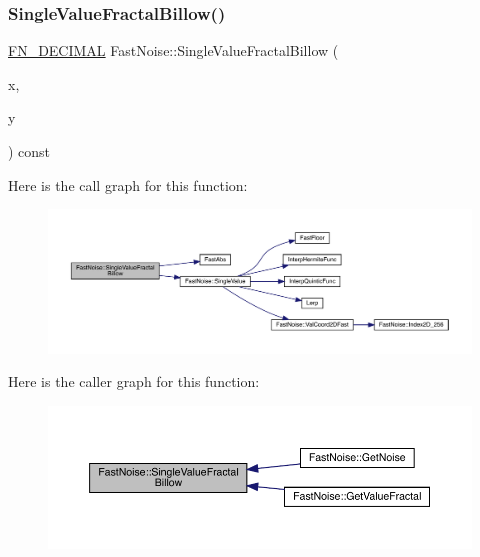 \subsubsection{\texorpdfstring{Single\+Value\+Fractal\+Billow()}{SingleValueFractalBillow()}\hspace{0.1cm}{\footnotesize\ttfamily [1/2]}}
{\footnotesize\ttfamily \mbox{\hyperlink{_fast_noise_8h_a75a9ef6d2541c4921815b885bfd449c3}{F\+N\+\_\+\+D\+E\+C\+I\+M\+AL}} Fast\+Noise\+::\+Single\+Value\+Fractal\+Billow (\begin{DoxyParamCaption}\item[{\mbox{\hyperlink{_fast_noise_8h_a75a9ef6d2541c4921815b885bfd449c3}{F\+N\+\_\+\+D\+E\+C\+I\+M\+AL}}}]{x,  }\item[{\mbox{\hyperlink{_fast_noise_8h_a75a9ef6d2541c4921815b885bfd449c3}{F\+N\+\_\+\+D\+E\+C\+I\+M\+AL}}}]{y }\end{DoxyParamCaption}) const\hspace{0.3cm}{\ttfamily [private]}}

Here is the call graph for this function\+:
\nopagebreak
\begin{figure}[H]
\begin{center}
\leavevmode
\includegraphics[width=350pt]{d1/dd8/class_fast_noise_a9ce9cdb72f3c9acaf76511d723e8e1ae_cgraph}
\end{center}
\end{figure}
Here is the caller graph for this function\+:
\nopagebreak
\begin{figure}[H]
\begin{center}
\leavevmode
\includegraphics[width=350pt]{d1/dd8/class_fast_noise_a9ce9cdb72f3c9acaf76511d723e8e1ae_icgraph}
\end{center}
\end{figure}
\mbox{\label{class_fast_noise_ac2534a36b0dfb1c6337a512787511754}} 
